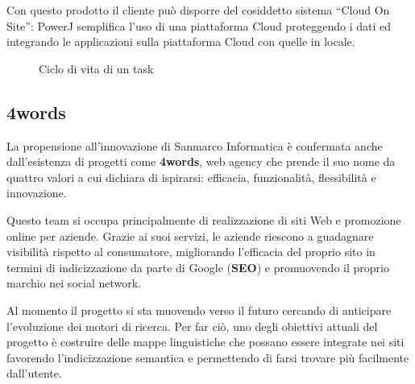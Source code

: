 Con questo prodotto il cliente può disporre del cosiddetto sistema ``Cloud On
Site'': PowerJ semplifica l'uso di una piattaforma Cloud proteggendo i dati ed
integrando le applicazioni sulla piattaforma Cloud con quelle in locale.


\begin{figure}[H]%
  \noindent{}%
  \caption{Ciclo di vita di un task}%
  \label{fig:task-lifecycle}%
\end{figure}

\subsection{4words} \mbox{}

La propensione all'innovazione di Sanmarco Informatica è confermata anche
dall'esistenza di progetti come \textbf{4words}, web agency che prende il suo
nome da quattro valori a cui dichiara di ispirarsi: efficacia, funzionalità,
flessibilità e innovazione.

Questo team si occupa principalmente di realizzazione di siti Web e promozione
online per aziende. Grazie ai suoi servizi, le aziende riescono a guadagnare
visibilità rispetto al consumatore, migliorando l'efficacia del proprio sito in
termini di indicizzazione da parte di Google (\textbf{SEO}) e promuovendo il
proprio marchio nei social network.

Al momento il progetto si sta muovendo verso il futuro cercando di anticipare
l'evoluzione dei motori di ricerca. Per far ciò, uno degli obiettivi attuali
del progetto è costruire delle mappe linguistiche che possano essere integrate
nei siti favorendo l'indicizzazione semantica e permettendo di farsi trovare
più facilmente dall'utente.

